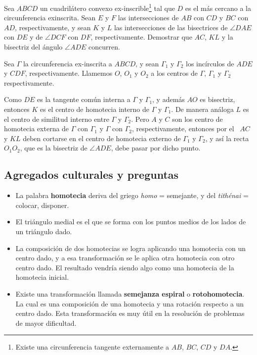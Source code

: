 \begin{section-example.tcb}{}{}
    Sea $ABCD$ un cuadrilátero convexo ex-inscrible\footnote{Existe una circunferencia tangente externamente a $AB$, $BC$, $CD$ y $DA$.} tal que $D$ es el más cercano a la circunferencia exinscrita.
    Sean $E$ y $F$ las intersecciones de $AB$ con $CD$ y $BC$ con $AD$, respectivamente, y sean $K$ y $L$ las intersecciones de las bisectrices de $\angle DAE$ con $DE$ y de $\angle DCF$ con $DF$, respectivamente.
    Demostrar que $AC$, $KL$ y la bisectriz del ángulo $\angle ADE$ concurren.
\end{section-example.tcb}
\begin{solution}
    Sea $\Gamma$ la circunferencia ex-inscrita a $ABCD$, y sean $\Gamma_1$ y $\Gamma_2$ los incírculos de $ADE$ y $CDF$, respectivamente.
    Llamemos $O$, $O_1$ y $O_2$ a los centros de $\Gamma$, $\Gamma_1$ y $\Gamma_2$ respectivamente.

    \begin{figure}[H]
        \centering
        
    \end{figure}

    Como $DE$ es la tangente común interna a $\Gamma$ y $\Gamma_1$, y además $AO$ es bisectriz, entonces $K$ es el centro de homotecia interno de $\Gamma$ y $\Gamma_1$.
    De manera análoga $L$ es el centro de similitud interno entre $\Gamma$ y $\Gamma_2$.
    Pero $A$ y $C$ son los centro de homotecia externa de $\Gamma$ con $\Gamma_1$ y $\Gamma$ con $\Gamma_2$, respectivamente, entonces por el~ $AC$ y $KL$ deben cortarse en el centro de homotecia externo de $\Gamma_1$ y $\Gamma_2$, y así la recta $O_1 O_2$, que es la bisectriz de $\angle ADE$, debe pasar por dicho punto.
\end{solution}




\subsection{Agregados culturales y preguntas}

\begin{itemize}
    \item La palabra \textbf{homotecia} deriva del griego \textit{homo} = semejante, y del \textit{tithénai} = colocar, disponer.
    \item El triángulo medial es el que se forma con los puntos medios de los lados de un triángulo dado.
    \item La composición de dos homotecias se logra aplicando una homotecia con un centro dado, y a esa transformación se le aplica otra homotecia con otro centro dado.
    El resultado vendría siendo algo como una homotecia de la homotecia inicial.
    \item Existe una transformación llamada \textbf{semejanza espiral} o \textbf{rotohomotecia}.
    La cual es una composición de una homotecia y una rotación respecto a un centro dado.
    Esta transformación es muy útil en la resolución de problemas de mayor dificultad.
\end{itemize}



